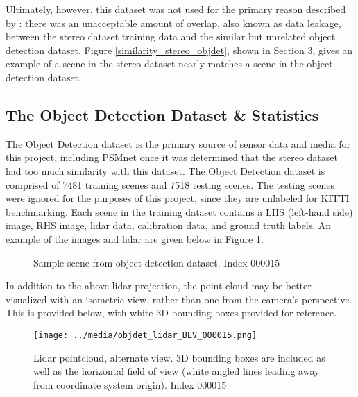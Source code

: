 Ultimately, however, this dataset was not used for the primary reason described by \cite{wang_pseudo-lidar_2019}: there was an unacceptable amount of overlap, also known as data leakage, between the stereo dataset training data and the similar but unrelated object detection dataset. Figure \ref{similarity_stereo_objdet}, shown in Section 3, gives an example of a scene in the stereo dataset nearly matches a scene in the object detection dataset.

\subsection{The Object Detection Dataset \& Statistics}
The Object Detection dataset is the primary source of sensor data and media for this project, including PSMnet once it was determined that the stereo dataset had too much similarity with this dataset. The Object Detection dataset is comprised of 7481 training scenes and 7518 testing scenes. The testing scenes were ignored for the purposes of this project, since they are unlabeled for KITTI benchmarking. Each scene in the training dataset contains a LHS (left-hand side) image, RHS image, lidar data, calibration data, and ground truth labels. An example of the images and lidar are given below in Figure \ref{objdet_sample}. 

\begin{figure}[H]
    \centering
    \caption{Sample scene from object detection dataset. Index 000015}
    \label{objdet_sample}
\end{figure}

In addition to the above lidar projection, the point cloud may be better visualized with an isometric view, rather than one from the camera's perspective. This is provided below, with white 3D bounding boxes provided for reference.

\begin{figure}[H]
    \texttt{[image: ../media/objdet\_lidar\_BEV\_000015.png]}
    \caption{Lidar pointcloud, alternate view. 3D bounding boxes are included as well as the horizontal field of view (white angled lines leading away from coordinate system origin). Index 000015}
    \label{objdet_lidar_sample}
\end{figure}

